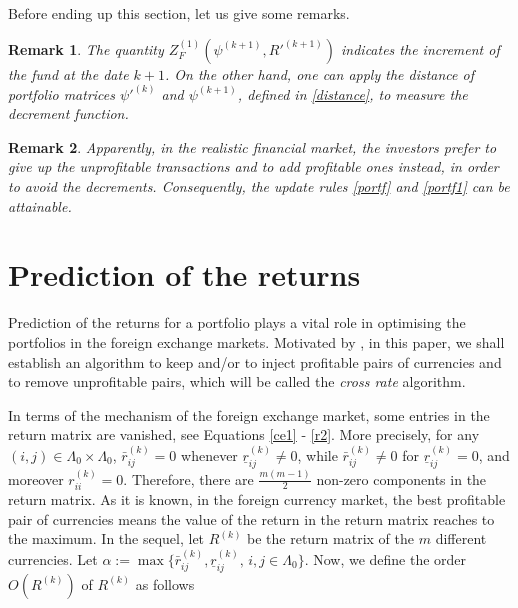 \documentclass[11pt]{article}
\newtheorem{remark}{Remark}[section]
\numberwithin{equation}{section}
\begin{document}
Before ending up this section, let us give some remarks. 
\begin{remark}
The quantity $Z_F^{(1)}(\psi^{(k+1)},R'^{(k+1)})$ indicates the increment of the fund at the date $k+1$. On the other hand, one can apply the distance of portfolio matrices  $\psi'^{(k)}$ and
$\psi^{(k+1)}$, defined in \eqref{distance}, to measure the decrement function.
\end{remark}

\begin{remark}
Apparently, in the realistic financial market, the investors prefer to give up the unprofitable transactions and to add profitable ones instead, in order to avoid the decrements. Consequently, 
the update rules \eqref{portf}  and \eqref{portf1}  can be attainable.
\end{remark}

\section{Prediction of the returns}
 
Prediction of the returns for a portfolio plays a vital role in  optimising  the portfolios in the foreign exchange markets. Motivated by \cite{ALZ2001}, in this paper,  we shall establish 
an algorithm to keep and/or to inject profitable pairs of currencies and to remove unprofitable pairs, which will be called the {\it cross rate} algorithm. 

In terms of the  mechanism of the foreign exchange market, some entries in the return matrix are vanished, see Equations \eqref{ce1} - \eqref{r2}. More precisely,  for any 
$(i,j)\in\Lambda_0\times\Lambda_0$,  $ \bar r_{ij}^{(k)}=0$ whenever $\underline{r}_{ij}^{(k)}\neq 0$, while $ \bar r_{ij}^{(k)}\neq0$ for $\underline{r}_{ij}^{(k)}=0$, and moreover 
$r_{ii}^{(k)}=0$. Therefore, there are $\frac{m(m-1)}{2}$ non-zero components  in the return matrix. As it is known, in the foreign currency market, the best profitable pair of currencies 
means the value of the return in the return matrix reaches to the maximum. In the sequel, let $R^{(k)}$ be the return matrix of the $m$ different currencies.  Let 
$\alpha:=\max\{\bar r_{ij}^{(k)}, \underline r_{ij}^{(k)}, \, i,j\in\Lambda_0\}$. Now, we define the order  $ O(R^{(k)})$ of $R^{(k)}$ as follows  
\end{document}
